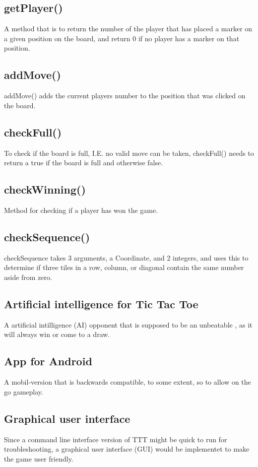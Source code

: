 \documentclass[a4paper,10pt]{article}
\begin{document}
	\subsection{getPlayer()}
	A method that is to return the number of the player that has placed a marker on a given position on the board, and return 0 if no player has a marker on that position.
	\subsection{addMove()}
	addMove() adds the current players number to the position that was clicked on the board.
	\subsection{checkFull()}
	To check if the board is full, I.E. no valid move can be taken, checkFull() needs to return a true if the board is full and otherwise false.
	\subsection{checkWinning()}
	Method for checking if a player has won the game. 
	\subsection{checkSequence()}
	checkSequence takes 3 arguments, a Coordinate, and 2 integers, and uses this to determine if three tiles in a row, column, or diagonal contain the same number aside from zero.
	\subsection{Artificial intelligence for Tic Tac Toe}
	A artificial intilligence (AI) opponent that is supposed to be an unbeatable , as it will always win or come to a draw. 
	\subsection{App for Android}
	A mobil-version that is backwards compatible, to some extent, so to allow on the go gameplay.
	\subsection{Graphical user interface}
	Since a command line interface version of TTT might be quick to run for troubleshooting, a graphical user interface (GUI) would be implementet to make the game user friendly.
	
\end{document}
